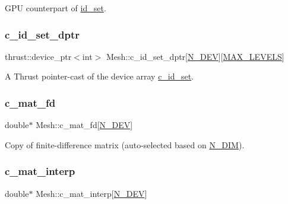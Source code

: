 G\+PU counterpart of \hyperlink{classMesh_a56b8d1c6a79e59537d3ca70fb176fe30}{id\+\_\+set}. 

\mbox{\label{classMesh_af0749240e39786e28e8cfc98f67f0076}} 
\subsubsection{\texorpdfstring{c\+\_\+id\+\_\+set\+\_\+dptr}{c\_id\_set\_dptr}}
{\footnotesize\ttfamily thrust\+::device\+\_\+ptr$<$int$>$ Mesh\+::c\+\_\+id\+\_\+set\+\_\+dptr\mbox{[}\hyperlink{cppspec_8h_a2b674dab7a14f1bf32b48b7fda5022dc}{N\+\_\+\+D\+EV}\mbox{]}\mbox{[}\hyperlink{cppspec_8h_add784659439a8dd6b1423406171414d3}{M\+A\+X\+\_\+\+L\+E\+V\+E\+LS}\mbox{]}}



A Thrust pointer-\/cast of the device array \hyperlink{classMesh_ae4bc3c2c0013415db58fa77623b21ca5}{c\+\_\+id\+\_\+set}. 

\mbox{\label{classMesh_a7e945bb93aa52a3fc98cf42ba8563830}} 
\subsubsection{\texorpdfstring{c\+\_\+mat\+\_\+fd}{c\_mat\_fd}}
{\footnotesize\ttfamily double$\ast$ Mesh\+::c\+\_\+mat\+\_\+fd\mbox{[}\hyperlink{cppspec_8h_a2b674dab7a14f1bf32b48b7fda5022dc}{N\+\_\+\+D\+EV}\mbox{]}}



Copy of finite-\/difference matrix (auto-\/selected based on \hyperlink{cppspec_8h_a327d0faa306d7663502be8df312a815e}{N\+\_\+\+D\+IM}). 

\mbox{\label{classMesh_a62654a23312cea092be756fb57a3773c}} 
\subsubsection{\texorpdfstring{c\+\_\+mat\+\_\+interp}{c\_mat\_interp}}
{\footnotesize\ttfamily double$\ast$ Mesh\+::c\+\_\+mat\+\_\+interp\mbox{[}\hyperlink{cppspec_8h_a2b674dab7a14f1bf32b48b7fda5022dc}{N\+\_\+\+D\+EV}\mbox{]}}



